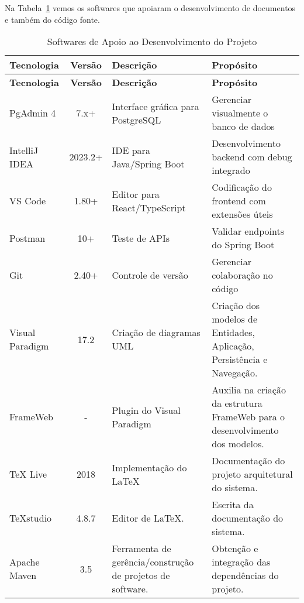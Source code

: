 
Na Tabela~\ref{tabela-software} vemos os softwares que apoiaram o desenvolvimento de documentos e também do código fonte.

\begin{footnotesize}
\begin{longtable}{|p{2.5cm}|c|p{5cm}|p{5.5cm}|}
	\caption{Softwares de Apoio ao Desenvolvimento do Projeto}	
	\label{tabela-software}\\\hline
	
	\rowcolor{lightgray}
	\textbf{Tecnologia} & \textbf{Versão} & \textbf{Descrição} & \textbf{Propósito} \\\hline 
	\endfirsthead
	\hline
	\rowcolor{lightgray}
	\textbf{Tecnologia} & \textbf{Versão} & \textbf{Descrição} & \textbf{Propósito} \\\hline 
	\endhead
	
	PgAdmin 4 & 7.x+ & Interface gráfica para PostgreSQL & Gerenciar visualmente o banco de dados \\\hline
	
	IntelliJ IDEA & 2023.2+ & IDE para Java/Spring Boot & Desenvolvimento backend com debug integrado \\\hline 
	
	VS Code & 1.80+ & Editor para React/TypeScript & Codificação do frontend com extensões úteis \\\hline
	
	Postman & 10+ & Teste de APIs & Validar endpoints do Spring Boot \\\hline 
	
	Git & 2.40+ & Controle de versão & Gerenciar colaboração no código \\\hline 
	 
	Visual Paradigm & 17.2 & Criação de diagramas UML & Criação dos modelos de Entidades, Aplicação, Persistência e Navegação. \\\hline
	
	FrameWeb & - & Plugin do Visual Paradigm & Auxilia na criação da estrutura FrameWeb para o desenvolvimento dos modelos. \\\hline

	TeX Live  & 2018 & Implementação do \LaTeX & Documentação do projeto arquitetural do sistema. \\\hline       
	
	TeXstudio & 4.8.7 & Editor de LaTeX. &  Escrita da documentação do sistema. \\\hline    
	
	Apache Maven & 3.5 & Ferramenta de gerência/construção de projetos de software. & Obtenção e integração das dependências do projeto. \\\hline
\end{longtable}
\end{footnotesize}
